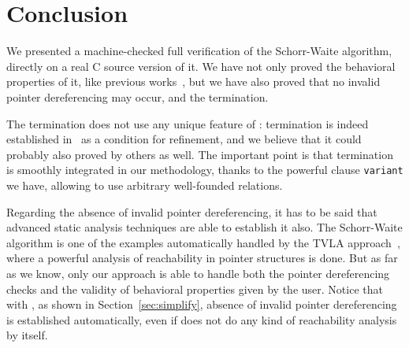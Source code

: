 \section{Conclusion}
\label{sec:conclusion}

We presented a machine-checked full verification of the Schorr-Waite
algorithm, directly on a real C source version of it. We have not only
proved the behavioral properties of it, like previous
works~\cite{bornat00mpc,mehta03cade,abrial03fme}, but we have also
proved that no invalid pointer dereferencing may occur, and the
termination.

The termination does not use any unique feature of \caduceus{}:
termination is indeed established in~\cite{abrial03fme} as a condition
for refinement, and we believe that it could probably also proved by
others as well. The important point is that termination is smoothly
integrated in our methodology, thanks to the powerful clause
\texttt{variant} we have, allowing to use arbitrary well-founded
relations.

Regarding the absence of invalid pointer dereferencing, it has to be
said that advanced static analysis techniques are able to establish it
also. The Schorr-Waite algorithm is one of the examples automatically
handled by the TVLA approach~\cite{sagiv02toplas,reps03esop}, where a powerful
analysis of reachability in pointer structures is done. But as far as
we know, only our approach is able to handle both the pointer
dereferencing checks and the validity of behavioral properties given
by the user. Notice that with \caduceus, as shown in
Section~\ref{sec:simplify}, absence of invalid pointer dereferencing
is established automatically, even if \caduceus{} does not do any kind of
reachability analysis by itself.


